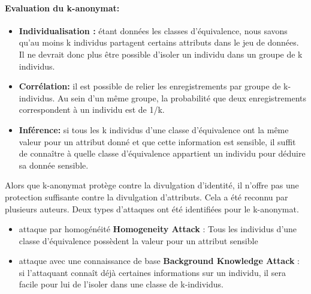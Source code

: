\paragraph{Evaluation du k-anonymat:}  
\begin{itemize}
    \item \textbf{Individualisation :} étant données les classes d’équivalence, nous savons qu’au moins k individus partagent certains attributs dans le jeu de données. Il ne devrait donc plus être possible d’isoler un individu dans un groupe de k individus. 

    \item \textbf{Corrélation:} il est possible de relier les enregistrements par groupe de k-individus. Au sein d’un même groupe, la probabilité que deux enregistrements correspondent à un individu est de 1/k. 

    \item \textbf{Inférence:} si tous les k individus d’une classe d’équivalence ont la même valeur pour un attribut donné et que cette information est sensible, il suffit de connaître à quelle classe d’équivalence appartient un individu pour déduire sa donnée sensible. 
\end{itemize}
 
Alors que k-anonymat protège contre la divulgation d'identité, il n'offre pas une protection suffisante contre la divulgation d'attributs. Cela a été reconnu par plusieurs auteurs\cite{truta_privacy_2006,machanavajjhala_l-diversity:_2006}. Deux types d'attaques ont été identifiées pour le k-anonymat.
\begin{itemize}
    \item attaque par homogénéité \textbf{Homogeneity Attack} : Tous les individus d'une classe d'équivalence possèdent la valeur pour un attribut sensible
    \item  attaque avec une connaissance de base \textbf{Background Knowledge Attack} \cite{machanavajjhala_l-diversity:_2006} : si l'attaquant connaît déjà certaines informations sur un individu, il sera facile pour lui de l'isoler dans une classe de k-individus. 
\end{itemize} 
